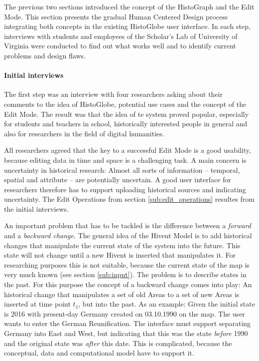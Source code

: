 The previous two sections introduced the concept of the HistoGraph and the Edit Mode. This section presents the gradual Human Centered Design process integrating both concepts in the existing HistoGlobe user interface. In each step, interviews with students and employees of the Scholar's Lab of University of Virginia were conducted to find out what works well and to identify current problems and design flaws.

\paragraph{Initial interviews} %
\label{par:initial_interviews}

The first step was an interview with four researchers asking about their comments to the idea of HistoGlobe, potential use cases and the concept of the Edit Mode. The result was that the idea of te system proved popular, especially for students and teachers in school, historically interested people in general and also for researchers in the field of digital humanities.

All researchers agreed that the key to a successful Edit Mode is a good usability, because editing data in time and space is a challenging task. A main concern is uncertainty in historical research: Almost all sorts of information -- temporal, spatial and attribute -- are potentially uncertain. A good user interface for researchers therefore has to support uploading historical sources and indicating uncertainty. The Edit Operations from section \ref{sub:edit_operations} resultes from the initial interviews.

An important problem that has to be tackled is the difference between a \emph{forward} and a \emph{backward change}. The general idea of the Hivent Model is to add historical changes that manipulate the current state of the system into the future. This state will not change until a new Hivent is inserted that manipulates it. For researching purposes this is not suitable, because the current state of the map is very much known (see section \ref{sub:input}). The problem is to describe states in the past. For this purpose the concept of a backward change comes into play: An historical change that manipulates a set of old Areas to a set of new Areas is inserted at time point $t_1$, but into the past. As an example: Given the initial state is 2016 with present-day Germany created on 03.10.1990 on the map. The user wants to enter the German Reunification. The interface must support separating Germany into East and West, but indicating that this was the state \emph{before} 1990 and the original state was \emph{after} this date. This is complicated, because the conceptual, data and computational model have to support it.

